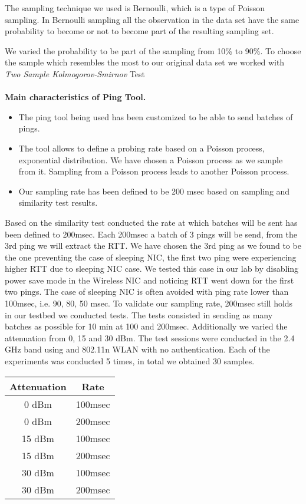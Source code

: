 The sampling technique we used is Bernoulli, which is a type of Poisson sampling. In Bernoulli sampling all the observation in the data set have the same probability to become or not to become part of the resulting sampling set.

We varied the probability to be part of the sampling from 10\% to 90\%. To choose the sample which resembles the most to our original data set we worked with \emph{Two Sample Kolmogorov-Smirnov} Test
\\
\\
\textbf{Main characteristics of Ping Tool.}
\begin{itemize}
	\item The ping tool being used has been customized to be able to send batches of pings.
	\item The tool allows to define a probing rate based on a Poisson process, exponential distribution. We have chosen a Poisson process as we sample from it. Sampling from a Poisson process leads to another Poisson process.
	\item Our sampling rate has been defined to be 200 msec based on sampling and similarity test results.
\end{itemize}

Based on the similarity test conducted the rate at which batches will be sent has been defined to 200msec. Each 200msec a batch of 3 pings will be send, from the 3rd ping we will extract the RTT. We have chosen the 3rd ping as we found to be the one preventing the case of sleeping NIC, the first two ping were experiencing higher RTT due to sleeping NIC case. We tested this case in our lab by disabling power save mode in the Wireless NIC and noticing RTT went down for the first two pings. The case of sleeping NIC is often avoided with ping rate lower than 100msec, i.e. 90, 80, 50 msec. To validate our sampling rate, 200msec still holds in our testbed we conducted tests. The tests consisted in sending as many batches as possible for 10 min at 100 and 200msec. Additionally we varied the attenuation from 0, 15 and 30 dBm. The test sessions were conducted in the 2.4 GHz band using and 802.11n WLAN with no authentication. Each of the experiments was conducted 5 times, in total we obtained 30 samples.

\begin{center}
	\begin{tabular}{||c c||}
		\hline
		Attenuation & Rate\\ [0.5ex] 
		\hline\hline
		0 dBm & 100msec\\ 
		\hline
		0 dBm & 200msec\\
		\hline
		15 dBm & 100msec\\
		\hline
		15 dBm & 200msec\\
		\hline
		30 dBm & 100msec\\
		\hline
		30 dBm & 200msec\\ [1ex] 
		\hline
	\end{tabular}
\end{center}

